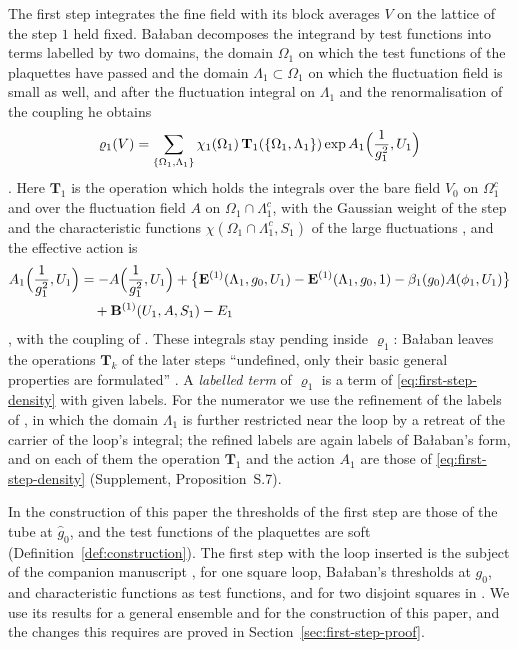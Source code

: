 \documentclass[11pt]{preprint}
\numberwithin{equation}{section}
\theoremstyle{definition}
\theoremstyle{remark}
\theoremstyle{plain}
\begin{document}
The first step integrates the fine field with its block averages $V$ on the lattice of the step $1$ held fixed. Ba{\l}aban decomposes the integrand by test functions into terms labelled by two domains, the domain $\Omega_1$ on which the test functions of the plaquettes have passed and the domain $\Lambda_1 \subset \Omega_1$ on which the fluctuation field is small as well, and after the fluctuation integral on $\Lambda_1$ and the renormalisation of the coupling he obtains
\begin{equation}\label{eq:first-step-density}
    \varrho_1(V) = \sum_{\{ \Omega_1, \Lambda_1 \}}\chi_1(\Omega_1)\,\mathbf T_1(\{ \Omega_1, \Lambda_1 \})\exp A_1\Bigl(\frac{1}{g_1^2}, U_1\Bigr)
\end{equation}
\cite[(1.28), p.~253]{BalabanCRE}. Here $\mathbf T_1$ is the operation which holds the integrals over the bare field $V_0$ on $\Omega_1^c$ and over the fluctuation field $A$ on $\Omega_1 \cap \Lambda_1^c$, with the Gaussian weight of the step and the characteristic functions $\chi(\Omega_1 \cap \Lambda_1^c, S_1)$ of the large fluctuations \cite[(1.29), p.~254]{BalabanCRE}, and the effective action is
\begin{equation}\label{eq:first-step-action}
\begin{split}
    A_1\Bigl(\frac{1}{g_1^2}, U_1\Bigr) &= -A\Bigl(\frac{1}{g_1^2}, U_1\Bigr) + \bigl\{ \mathbf E^{(1)}(\Lambda_1, g_0, U_1) - \mathbf E^{(1)}(\Lambda_1, g_0, 1) - \beta_1(g_0)A(\phi_1, U_1) \bigr\}\\
    &\quad + \mathbf B^{(1)}(U_1, A, S_1) - E_1
\end{split}
\end{equation}
\cite[(1.30), p.~254]{BalabanCRE}, with the coupling of \cite[(1.27), p.~253]{BalabanCRE}. These integrals stay pending inside $\varrho_1$: Ba{\l}aban leaves the operations $\mathbf T_k$ of the later steps ``undefined, only their basic general properties are formulated'' \cite[p.~254]{BalabanCRE}. A \emph{labelled term} of $\varrho_1$ is a term of \eqref{eq:first-step-density} with given labels. For the numerator we use the refinement of the labels of \cite[Section~9]{WilsonFirstStep}, in which the domain $\Lambda_1$ is further restricted near the loop by a retreat of the carrier of the loop's integral; the refined labels are again labels of Ba{\l}aban's form, and on each of them the operation $\mathbf T_1$ and the action $A_1$ are those of \eqref{eq:first-step-density} (Supplement, Proposition~S.7).

In the construction of this paper the thresholds of the first step are those of the tube at $\hat g_0$, and the test functions of the plaquettes are soft (Definition~\ref{def:construction}). The first step with the loop inserted is the subject of the companion manuscript \cite{WilsonFirstStep}, for one square loop, Ba{\l}aban's thresholds at $g_0$, and characteristic functions as test functions, and for two disjoint squares in \cite[Section~10]{WilsonFirstStep}. We use its results for a general ensemble and for the construction of this paper, and the changes this requires are proved in Section~\ref{sec:first-step-proof}.
\end{document}
